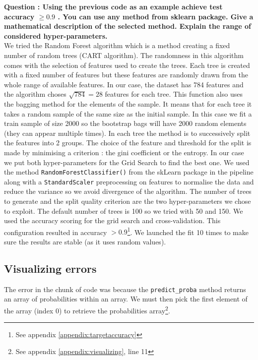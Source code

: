 \textbf{Question : Using the previous code as an example achieve test accuracy  $\geq0.9$ . You can use any method from sklearn package. Give a mathematical description of the selected method. Explain the range of considered hyper-parameters.}\\

We tried the Random Forest algorithm which is a method creating a fixed number of random trees (CART algorithm). The randomness in this algorithm comes with the selection of features used to create the trees. Each tree is created with a fixed number of features but these features are randomly drawn from the whole range of available features. In our case, the dataset has 784 features and the algorithm choses $\sqrt{784} = 28$ features for each tree. This function also uses the bagging method for the elements of the sample. It means that for each tree it takes a random sample of the same size as the initial sample. In this case we fit a train sample of size 2000 so the bootstrap bags will have 2000 random elements (they can appear multiple times). In each tree the method is to successively split the features into 2 groups. The choice of the feature and threshold for the split is made by minimising a criterion : the gini coefficient or the entropy. In our case we put both hyper-parameters for the Grid Search to find the best one. 
We used the method \verb|RandomForestClassifier()| from the skLearn package in the pipeline along with a \verb|StandardScaler| preprocessing on features to normalise the data and reduce the variance so we avoid divergence of the algorithm. The number of trees to generate and the split quality criterion are the two hyper-parameters we chose to exploit. The default number of trees is 100 so we tried with 50 and 150. We used the accuracy scoring for the grid search and cross-validation. This configuration resulted in accuracy $>0.9$\footnote{See appendix \ref{appendix:targetaccuracy}}. We launched the fit 10 times to make sure the results are stable (as it uses random values). 

\subsection{Visualizing errors}
The error in the chunk of code was because the \verb|predict_proba| method returns an array of probabilities within an array. We must then pick the first element of the array (index 0) to retrieve the probabilities array\footnote{See appendix \ref{appendix:visualizing}, line 11}.\\

